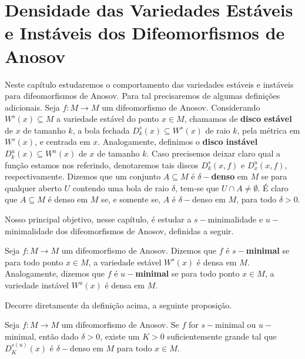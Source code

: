 %

\chapter{Densidade das Variedades Estáveis e Instáveis dos Difeomorfismos de Anosov}

Neste capítulo estudaremos o comportamento das variedades estáveis e instáveis para difeomorfismos de Anosov. Para tal precisaremos de algumas definições adicionais. Seja $f:M\to M$ um difeomorfismo de Anosov. Considerando $W^{s}(x)\subseteq M$ a variedade estável do ponto $x\in M$, chamamos de \textbf{disco estável} de $x$ de tamanho $k$, a bola fechada $D_k^{s}(x)\subseteq W^{s}(x)$ de raio $k$, pela métrica em $W^{s}(x)$, e centrada em $x$. Analogamente, definimos o \textbf{disco instável} $D_k^{u}(x)\subseteq W^{u}(x)$ de $x$ de tamanho $k$. Caso precisemos deixar claro qual a função estamos nos referindo, denotaremos tais discos $D^s_{k}(x,f)$ e $D^u_{x}(x,f)$, respectivamente. Dizemos que um conjunto $A\subseteq M$ é \textbf{$\delta-$denso} em $M$ se para qualquer aberto $U$ contendo uma bola de raio $\delta$, tem-se que $U\cap A\neq\emptyset$. É claro que $A\subseteq M$ é denso em $M$ se, e somente se, $A$ é $\delta-$denso em $M$, para todo $\delta>0$.

Nosso principal objetivo, nesse capítulo, é estudar a $s-$minimalidade e $u-$minimalidade dos difeomorfismos de Anosov, definidas a seguir.

\begin{definicao} Seja $f:M\to M$ um difeomorfismo de Anosov. Dizemos que $f$ é \textbf{$s-$minimal} se para todo ponto $x\in M$, a variedade estável $W^{s}(x)$ é densa em $M$. Analogamente, dizemos que $f$ é \textbf{$u-$minimal} se para todo ponto $x\in M$, a variedade instável $W^{u}(x)$ é densa em $M$. 
\end{definicao}

Decorre diretamente da definição acima, a seguinte proposição.

\begin{proposicao}\label{deltadenso} Seja $f:M\to M$ um difeomorfismo de Anosov. Se $f$ for $s-$minimal ou $u-$minimal, então dado $\delta>0$, existe um $K>0$ suficientemente grande tal que $D_K^{s(u)}(x)$ é $\delta-$denso em $M$ para todo $x\in M$.
\end{proposicao}

